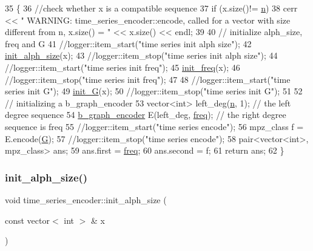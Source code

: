 \begin{DoxyCode}
35 \{
36   \textcolor{comment}{//check whether x is a compatible sequence}
37   \textcolor{keywordflow}{if} (x.size()!= \hyperlink{classtime__series__encoder_ab84b7528d50c495fc140f1eb50d9b539}{n})
38     cerr << \textcolor{stringliteral}{" WARNING: time\_series\_encoder::encode, called for a vector with size different from n,
       x.size() = "} << x.size() << endl;
39 
40   \textcolor{comment}{// initialize alph\_size, freq and G}
41   \textcolor{comment}{//logger::item\_start("time series init alph size");}
42   \hyperlink{classtime__series__encoder_a8607e6953e5115a3c8a198266d2db8ce}{init\_alph\_size}(x);
43   \textcolor{comment}{//logger::item\_stop("time series init alph size");}
44   \textcolor{comment}{//logger::item\_start("time series init freq");}
45   \hyperlink{classtime__series__encoder_af4b8988acb10fe076be59302e47084be}{init\_freq}(x);
46   \textcolor{comment}{//logger::item\_stop("time series init freq");}
47 
48   \textcolor{comment}{//logger::item\_start("time series init G");}
49   \hyperlink{classtime__series__encoder_a90eb54134d6af2ab2cca36ee13956470}{init\_G}(x);
50   \textcolor{comment}{//logger::item\_stop("time series init G");}
51   
52   \textcolor{comment}{// initializing a b\_graph\_encoder}
53   vector<int> left\_deg(\hyperlink{classtime__series__encoder_ab84b7528d50c495fc140f1eb50d9b539}{n}, 1); \textcolor{comment}{// the left degree sequence}
54   \hyperlink{classb__graph__encoder}{b\_graph\_encoder} E(left\_deg, \hyperlink{classtime__series__encoder_ac6496aa39f28da4d8fe964c495e76057}{freq}); \textcolor{comment}{// the right degree sequence is freq}
55   \textcolor{comment}{//logger::item\_start("time series encode");}
56   mpz\_class f = E.encode(\hyperlink{classtime__series__encoder_aa40f761a56f696e78e8888e50e8f45b9}{G});
57   \textcolor{comment}{//logger::item\_stop("time series encode");}
58   pair<vector<int>, mpz\_class> ans;
59   ans.first = \hyperlink{classtime__series__encoder_ac6496aa39f28da4d8fe964c495e76057}{freq};
60   ans.second  = f;
61   \textcolor{keywordflow}{return} ans;
62 \}
\end{DoxyCode}
\mbox{\label{classtime__series__encoder_a8607e6953e5115a3c8a198266d2db8ce}} 
\subsubsection{\texorpdfstring{init\+\_\+alph\+\_\+size()}{init\_alph\_size()}}
{\footnotesize\ttfamily void time\+\_\+series\+\_\+encoder\+::init\+\_\+alph\+\_\+size (\begin{DoxyParamCaption}\item[{const vector$<$ int $>$ \&}]{x }\end{DoxyParamCaption})\hspace{0.3cm}{\ttfamily [private]}}



